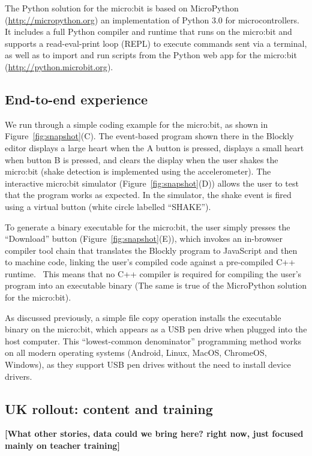 The Python solution for the micro:bit is based on MicroPython (\url{http://micropython.org})
an implementation of Python 3.0 for microcontrollers. It includes
a full Python compiler and runtime that runs on the micro:bit and
supports a read-eval-print loop (REPL) to execute commands sent via
a terminal, as well as to import and run scripts from the Python web app for
the micro:bit (\url{http://python.microbit.org}).

\subsection{End-to-end experience}

We run through a simple coding example for the micro:bit, as shown
in Figure~\ref{fig:snapshot}(C). The event-based program shown there
in the Blockly editor displays a large heart when the
A button is pressed, displays a small heart when button B is pressed,
and clears the display when the user shakes the micro:bit (shake
detection is implemented using the accelerometer). The interactive
micro:bit simulator
(Figure~\ref{fig:snapshot}(D)) allows the user to test that
the program works as expected. In the simulator, the
shake event is fired using a virtual button (white circle labelled
``SHAKE'').

To generate a binary executable for the micro:bit, the user
simply presses the ``Download'' button (Figure~\ref{fig:snapshot}(E)),
which invokes an in-browser compiler tool chain that translates
the Blockly program to JavaScript and then to machine code, linking
the user's compiled code against a pre-compiled
C++ runtime.~\cite{Devine2018} 
This means that no C++ compiler is required for
compiling the user's program into an executable binary
(The same is true of the MicroPython solution for the micro:bit).

As discussed previously, a simple file copy operation installs the
executable binary on the micro:bit, which appears as a USB pen drive
when plugged into the host computer. This ``lowest-common denominator''
programming method works on all modern operating systems 
(Android, Linux, MacOS, ChromeOS, Windows), as they support 
USB pen drives without the need to install device drivers. 

\subsection{UK rollout: content and training}

{\bf [What other stories, data could we bring here? right now, just focused mainly
on teacher training] }

